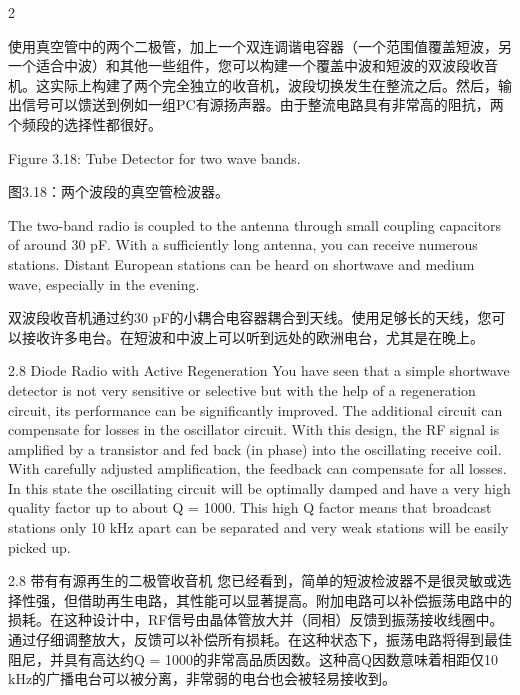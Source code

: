 \documentclass{ctexbook}
\begin{document}
\begin{paracol}{2}
\switchcolumn

使用真空管中的两个二极管，加上一个双连调谐电容器（一个范围值覆盖短波，另一个适合中波）和其他一些组件，您可以构建一个覆盖中波和短波的双波段收音机。这实际上构建了两个完全独立的收音机，波段切换发生在整流之后。然后，输出信号可以馈送到例如一组PC有源扬声器。由于整流电路具有非常高的阻抗，两个频段的选择性都很好。

\switchcolumn*

Figure 3.18: Tube Detector for two wave bands. 

\switchcolumn

图3.18：两个波段的真空管检波器。

\switchcolumn*

The two-band radio is coupled to the antenna through small coupling capacitors of around 
30 pF. With a sufficiently long antenna, you can receive numerous stations. Distant European stations can be heard on shortwave and medium wave, especially in the evening. 

\switchcolumn

双波段收音机通过约30 pF的小耦合电容器耦合到天线。使用足够长的天线，您可以接收许多电台。在短波和中波上可以听到远处的欧洲电台，尤其是在晚上。

\switchcolumn*

2.8 Diode Radio with Active Regeneration 
You have seen that a simple shortwave detector is not very sensitive or selective but with 
the help of a regeneration circuit, its performance can be significantly improved. The additional circuit can compensate for losses in the oscillator circuit. With this design, the RF 
signal is amplified by a transistor and fed back (in phase) into the oscillating receive coil. 
With carefully adjusted amplification, the feedback can compensate for all losses. In this 
state the oscillating circuit will be optimally damped and have a very high quality factor up 
to about Q = 1000. This high Q factor means that broadcast stations only 10 kHz apart can 
be separated and very weak stations will be easily picked up. 

\switchcolumn

2.8 带有有源再生的二极管收音机
您已经看到，简单的短波检波器不是很灵敏或选择性强，但借助再生电路，其性能可以显著提高。附加电路可以补偿振荡电路中的损耗。在这种设计中，RF信号由晶体管放大并（同相）反馈到振荡接收线圈中。通过仔细调整放大，反馈可以补偿所有损耗。在这种状态下，振荡电路将得到最佳阻尼，并具有高达约Q = 1000的非常高品质因数。这种高Q因数意味着相距仅10 kHz的广播电台可以被分离，非常弱的电台也会被轻易接收到。


\end{paracol}
\end{document}
